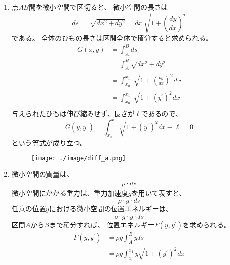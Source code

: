 \begin{enumerate}
  \item 点\(AB\)間を微小空間で区切ると、
  微小空間の長さは
  \begin{equation}\label{equation:2_1_a_1}
    ds = \sqrt[]{dx^{2} + dy^{2}} = dx \sqrt[]{1 + \left(\frac{dy}{dx}\right)^{2}}
  \end{equation}
  である。
  全体のひもの長さは区間全体で積分すると求められる。
  \begin{equation}\label{equation:2_1_a_2}
    \begin{split}
      G\left(x, y\right) &= \int^{B}_{A} ds \\
      &= \int^{B}_{A} \sqrt{dx^{2} + dy^{2}}\\
      &= \int^{x_{1}}_{x_{0}} \sqrt[]{1 + \left(\frac{dy}{dx}\right)^{2}} dx\\
      &= \int^{x_{1}}_{x_{0}} \sqrt[]{1 + \left(y^{\prime}\right)^{2}} dx\\
    \end{split}
  \end{equation}
  与えられたひもは伸び縮みせず、長さが\(\ell\)であるので、
  \begin{equation}\label{equation:2_1_a_3}
    G\left(y, y^{\prime}\right) = \int^{x_{1}}_{x_{0}} \sqrt[]{1 + \left(y^{\prime}\right)^{2}} dx - \ell = 0
  \end{equation}
  という等式が成り立つ。
  \begin{figure}[htbp]
    \centering
    \texttt{[image: ./image/diff\_a.png]}
    \caption{}
    \label{figure:2_1_a}
  \end{figure}

  \item 微小空間の質量は、
  \begin{equation}\label{equation:2_2_a_1}
    \begin{split}
      \rho \cdot ds
    \end{split}
  \end{equation}
  微小空間にかかる重力は、重力加速度\(g\)を用いて表すと、
  \begin{equation}\label{equation:2_2_a_2}
    \rho \cdot g \cdot ds
  \end{equation}
  任意の位置\(y\)における微小空間の位置エネルギーは、
  \begin{equation}\label{equation:2_2_a_3}
    \rho \cdot g \cdot y \cdot ds
  \end{equation}
  区間\(A\)から\(B\)まで積分すれば、
  位置エネルギー\(F\left(y, y^{\prime}\right)\)を求められる。
  \begin{equation}\label{equation:2_2_a_4}
    \begin{split}
      F\left(y, y^{\prime}\right) &= \rho g \int^{B}_{A} y ds \\
      &= \rho g \int^{x_1}_{x_0} y \sqrt{1 + \left(y^{\prime}\right)^2} dx
    \end{split}
  \end{equation}


\end{enumerate}
